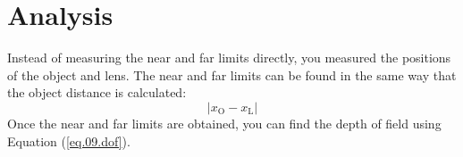 \section{Analysis}
%
Instead of measuring the near and far limits directly, you measured the positions of the object and lens. The near and far limits can be found in the same way that the object distance is calculated:
\begin{equation}
    \vert x_{\text{O}} - x_{\text{L}} \vert
\end{equation}
Once the near and far limits are obtained, you can find the depth of field using Equation (\ref{eq.09.dof}).
%
%
\newpage
